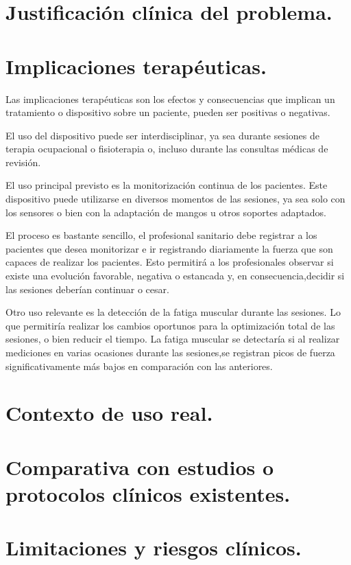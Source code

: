\section{Justificación clínica del problema.}

\section{Implicaciones terapéuticas.}
Las implicaciones terapéuticas son los efectos y consecuencias que implican un tratamiento o dispositivo sobre un paciente, pueden ser positivas o negativas.

El uso del dispositivo puede ser interdisciplinar, ya sea durante sesiones de terapia ocupacional o fisioterapia o, incluso durante las consultas médicas de revisión. 

El uso principal previsto es la monitorización continua de los pacientes. Este dispositivo puede utilizarse en diversos momentos de las sesiones, ya sea solo con los sensores o bien con la adaptación de mangos u otros soportes adaptados.

El proceso es bastante sencillo, el profesional sanitario debe registrar a los pacientes que desea monitorizar e ir registrando diariamente la fuerza que son capaces de realizar los pacientes. Esto permitirá a los profesionales observar si existe una evolución favorable, negativa o estancada y, en consecuencia,decidir si las sesiones deberían continuar o cesar. 

Otro uso relevante es la detección de la fatiga muscular durante las sesiones. Lo que permitiría realizar los cambios oportunos para la optimización total de las sesiones, o bien reducir el tiempo. La fatiga muscular se detectaría si al realizar mediciones en varias ocasiones durante las sesiones,se registran picos de fuerza significativamente más bajos en comparación con las anteriores.

\section{Contexto de uso real.}


\section{ Comparativa con estudios o protocolos clínicos existentes.}
\section{Limitaciones y riesgos clínicos.}